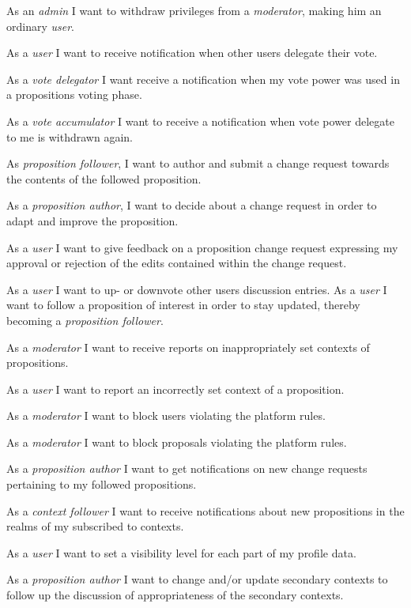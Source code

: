  As an \textit{admin} I want to withdraw privileges from a \textit{moderator}, making him an ordinary \textit{user}.

 As a \textit{user} I want to receive notification when other users delegate their vote.

 As a \textit{vote delegator} I want receive a notification when my vote power was used in a propositions voting phase.

 As a \textit{vote accumulator} I want to receive a notification when vote power delegate to me is withdrawn again.

 As \textit{proposition follower}, I want to author and submit a change request towards the contents of the followed proposition.

 As a \textit{proposition author}, I want to decide about a change request in order to adapt and improve the proposition.

 As a \textit{user} I want to give feedback on a proposition change request expressing my approval or rejection of the edits contained within the change request.

 As a \textit{user} I want to up- or downvote other users discussion entries.
 As a \textit{user} I want to follow a proposition of interest in order to stay updated, thereby becoming a \textit{proposition follower}.

 As a \textit{moderator} I want to receive reports on inappropriately set contexts of propositions.

 As a \textit{user} I want to report an incorrectly set context of a proposition.

 As a \textit{moderator} I want to block users violating the platform rules.

 As a \textit{moderator} I want to block proposals violating the platform rules.

 As a \textit{proposition author} I want to get notifications on new change requests pertaining to my followed propositions.

 As a \textit{context follower} I want to receive notifications about new propositions in the realms of my subscribed to contexts.

 As a \textit{user} I want to set a visibility level for each part of my profile data.

 As a \textit{proposition author} I want to change and/or update secondary contexts to follow up the discussion of appropriateness of the secondary contexts.

